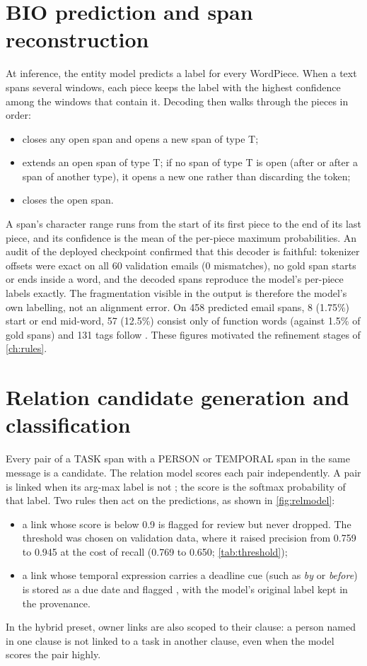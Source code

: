 \section{BIO prediction and span reconstruction}
\label{sec:decoding}
At inference, the entity model predicts a label for every WordPiece. When a text spans several windows, each piece keeps the label with the highest confidence among the windows that contain it. Decoding then walks through the pieces in order:
\begin{itemize}
  \item {} closes any open span and opens a new span of type T;
  \item {} extends an open span of type T; if no span of type T is open (after  or after a span of another type), it opens a new one rather than discarding the token;
  \item {} closes the open span.
\end{itemize}
A span's character range runs from the start of its first piece to the end of its last piece, and its confidence is the mean of the per-piece maximum probabilities. An audit of the deployed checkpoint confirmed that this decoder is faithful: tokenizer offsets were exact on all 60 validation emails (0 mismatches), no gold span starts or ends inside a word, and the decoded spans reproduce the model's per-piece labels exactly. The fragmentation visible in the output is therefore the model's own labelling, not an alignment error. On 458 predicted email spans, 8 (1.75\%) start or end mid-word, 57 (12.5\%) consist only of function words (against 1.5\% of gold spans) and 131  tags follow . These figures motivated the refinement stages of \cref{ch:rules}.

\section{Relation candidate generation and classification}
Every pair of a TASK span with a PERSON or TEMPORAL span in the same message is a candidate. The relation model scores each pair independently. A pair is linked when its arg-max label is not ; the score is the softmax probability of that label. Two rules then act on the predictions, as shown in \cref{fig:relmodel}:
\begin{itemize}
  \item a link whose score is below 0.9 is flagged  for review but never dropped. The threshold was chosen on validation data, where it raised precision from 0.759 to 0.945 at the cost of recall (0.769 to 0.650; \cref{tab:threshold});
  \item a  link whose temporal expression carries a deadline cue (such as \emph{by} or \emph{before}) is stored as a due date and flagged , with the model's original label kept in the provenance.
\end{itemize}
In the hybrid preset, owner links are also scoped to their clause: a person named in one clause is not linked to a task in another clause, even when the model scores the pair highly.

